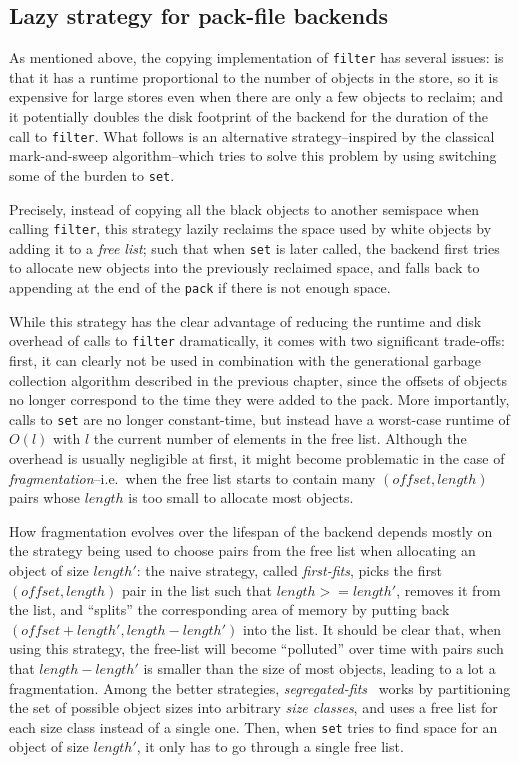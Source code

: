 \subsection{Lazy strategy for pack-file backends}

As mentioned above, the copying implementation of \texttt{filter} has several issues: is that it has a runtime proportional to the number of objects in the store, so it is expensive for large stores even when there are only a few objects to reclaim; and it potentially doubles the disk footprint of the backend for the duration of the call to \texttt{filter}. What follows is an alternative strategy--inspired by the classical mark-and-sweep algorithm--which tries to solve this problem by using switching some of the burden to \texttt{set}.

\bigskip
Precisely, instead of copying all the black objects to another semispace when calling \texttt{filter}, this strategy lazily reclaims the space used by white objects by adding it to a \emph{free list}; such that when \texttt{set} is later called, the backend first tries to allocate new objects into the previously reclaimed space, and falls back to appending at the end of the \texttt{pack} if there is not enough space.

While this strategy has the clear advantage of reducing the runtime and disk overhead of calls to \texttt{filter} dramatically, it comes with two significant trade-offs: first, it can clearly not be used in combination with the generational garbage collection algorithm described in the previous chapter, since the offsets of objects no longer correspond to the time they were added to the pack. More importantly, calls to \texttt{set} are no longer constant-time, but instead have a worst-case runtime of \(O(l)\) with \(l\) the current number of elements in the free list. Although the overhead is usually negligible at first, it might become problematic in the case of \emph{fragmentation}--i.e.~when the free list starts to contain many \((offset, length)\) pairs whose \(length\) is too small to allocate most objects.

How fragmentation evolves over the lifespan of the backend depends mostly on the strategy being used to choose pairs from the free list when allocating an object of size \(length'\): the naive strategy, called \emph{first-fits}, picks the first \((offset, length)\) pair in the list such that \(length >= length'\), removes it from the list, and ``splits'' the corresponding area of memory by putting back \((offset + length', length - length')\) into the list. It should be clear that, when using this strategy, the free-list will become ``polluted'' over time with pairs such that \(length - length'\) is smaller than the size of most objects, leading to a lot a fragmentation. Among the better strategies, \emph{segregated-fits}~\cite{comf64} works by partitioning the set of possible object sizes into arbitrary \emph{size classes}, and uses a free list for each size class instead of a single one. Then, when \texttt{set} tries to find space for an object of size \(length'\), it only has to go through a single free list.

